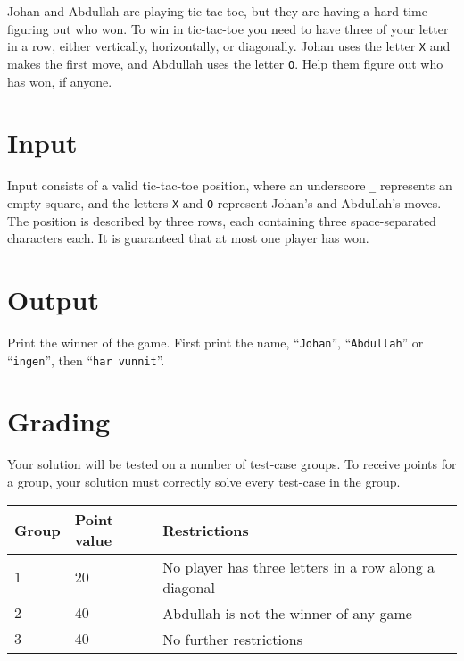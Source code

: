\noindent
Johan and Abdullah are playing tic-tac-toe, but they are having a hard time figuring out who won.
To win in tic-tac-toe you need to have three of your letter in a row, either vertically, horizontally, or diagonally.
Johan uses the letter \texttt{X} and makes the first move, and Abdullah uses the letter \texttt{O}. Help them figure out who has won, if anyone.

\section*{Input}
\noindent

\noindent
Input consists of a valid tic-tac-toe position, where an underscore \texttt{\_} represents an empty square, and the letters \texttt{X} and \texttt{O} represent Johan's and Abdullah's moves.
The position is described by three rows, each containing three space-separated characters each. It is guaranteed that at most one player has won.

\section*{Output}
\noindent
Print the winner of the game.
\noindent
First print the name, ``\texttt{Johan}'', ``\texttt{Abdullah}'' or ``\texttt{ingen}'', then ``\texttt{har vunnit}''.
\section*{Grading}
\noindent
Your solution will be tested on a number of test-case groups.
\noindent
To receive points for a group, your solution must correctly solve every test-case in the group.

\noindent
\begin{tabular}{| l | l | l |}
\hline
  Group & Point value & Restrictions \\ \hline
  $1$    & $20$       &  No player has three letters in a row along a diagonal  \\ \hline 
  $2$    & $40$       &  Abdullah is not the winner of any game \\ \hline
  $3$    & $40$       &  No further restrictions \\ \hline
\end{tabular}
